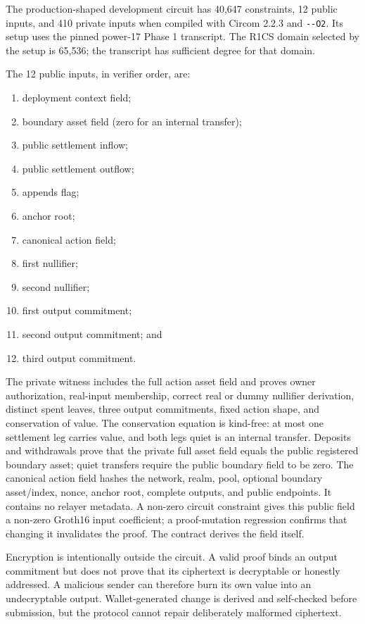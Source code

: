 \documentclass[11pt,letterpaper]{article}
\providecommand{\tightlist}{\setlength{\itemsep}{0pt}\setlength{\parskip}{0pt}}
\begin{document}
The production-shaped development circuit has 40,647 constraints, 12
public inputs, and 410 private inputs when compiled with Circom 2.2.3
and \texttt{-\/-O2}. Its setup uses the pinned power-17 Phase 1
transcript. The R1CS domain selected by the setup is 65,536; the
transcript has sufficient degree for that domain.

The 12 public inputs, in verifier order, are:

\begin{enumerate}
\def\labelenumi{\arabic{enumi}.}
\tightlist
\item
  deployment context field;
\item
  boundary asset field (zero for an internal transfer);
\item
  public settlement inflow;
\item
  public settlement outflow;
\item
  appends flag;
\item
  anchor root;
\item
  canonical action field;
\item
  first nullifier;
\item
  second nullifier;
\item
  first output commitment;
\item
  second output commitment; and
\item
  third output commitment.
\end{enumerate}

The private witness includes the full action asset field and proves
owner authorization, real-input membership, correct real or dummy
nullifier derivation, distinct spent leaves, three output commitments,
fixed action shape, and conservation of value. The conservation equation
is kind-free: at most one settlement leg carries value, and both legs
quiet is an internal transfer. Deposits and withdrawals prove that the
private full asset field equals the public registered boundary asset;
quiet transfers require the public boundary field to be zero. The
canonical action field hashes the network, realm, pool, optional
boundary asset/\allowbreak{}index, nonce, anchor root, complete outputs,
and public endpoints. It contains no relayer metadata. A non-zero
circuit constraint gives this public field a non-zero Groth16 input
coefficient; a proof-mutation regression confirms that changing it
invalidates the proof. The contract derives the field itself.

Encryption is intentionally outside the circuit. A valid proof binds an
output commitment but does not prove that its ciphertext is decryptable
or honestly addressed. A malicious sender can therefore burn its own
value into an undecryptable output. Wallet-generated change is derived
and self-checked before submission, but the protocol cannot repair
deliberately malformed ciphertext.
\end{document}
